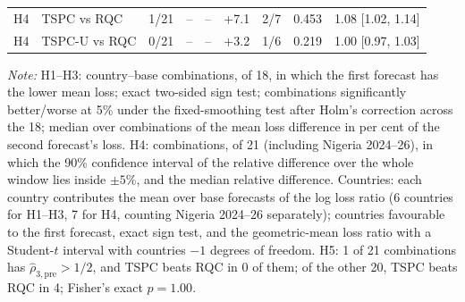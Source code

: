 \begin{table}[t]
\begin{tabular*}{\columnwidth}{@{\extracolsep\fill}llrrrrrrr@{}}
H4 & TSPC vs RQC & 1/21 & -- & -- & +7.1 & 2/7 & 0.453 & 1.08 [1.02, 1.14] \\
H4 & TSPC-U vs RQC & 0/21 & -- & -- & +3.2 & 1/6 & 0.219 & 1.00 [0.97, 1.03] \\
\bottomrule
\end{tabular*}
\begin{tablenotes}
\item \textit{Note:} H1--H3: country--base combinations, of 18, in which the first forecast has the lower mean loss; exact two-sided sign test; combinations significantly better/worse at 5\% under the fixed-smoothing test after Holm's correction across the 18; median over combinations of the mean loss difference in per cent of the second forecast's loss. H4: combinations, of 21 (including Nigeria 2024--26), in which the 90\% confidence interval of the relative difference over the whole window lies inside $\pm5\%$, and the median relative difference. Countries: each country contributes the mean over base forecasts of the log loss ratio (6 countries for H1--H3, 7 for H4, counting Nigeria 2024--26 separately); countries favourable to the first forecast, exact sign test, and the geometric-mean loss ratio with a Student-$t$ interval with countries $-1$ degrees of freedom. H5: 1 of 21 combinations has $\widehat\rho_{3,\mathrm{pre}}>1/2$, and TSPC beats RQC in 0 of them; of the other 20, TSPC beats RQC in 4; Fisher's exact $p=1.00$.
\end{tablenotes}
\end{table}
